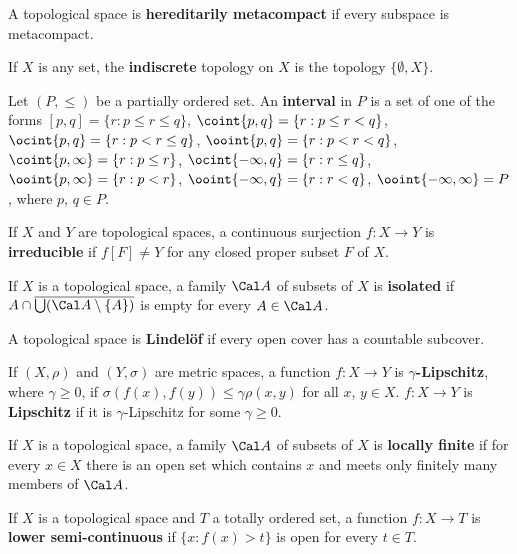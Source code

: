  A topological space is {\bf
hereditarily metacompact} if every subspace is metacompact.

 If $X$ is any set, the {\bf indiscrete} topology on
$X$ is the topology $\{\emptyset,X\}$.

 Let $(P,\le)$ be a partially ordered set.
An {\bf interval} in $P$ is a set of one of the forms
$[p,q]=\{r:p\le r\le q\}$, $\coint{p,q}=\{r:p\le r<q\}$,
$\ocint{p,q}=\{r:p<r\le q\}$, $\ooint{p,q}=\{r:p<r<q\}$,
$\coint{p,\infty}=\{r:p\le r\}$,
$\ocint{-\infty,q}=\{r:r\le q\}$, $\ooint{p,\infty}=\{r:p<r\}$,
$\ooint{-\infty,q}=\{r:r<q\}$, $\ooint{-\infty,\infty}=P$, where $p$,
$q\in P$.   

 If $X$ and $Y$ are topological spaces, a continuous
surjection $f:X\to Y$ is {\bf irreducible} if $f[F]\ne Y$ for any closed
proper subset $F$ of $X$.

 If $X$ is a topological space, a family
$\Cal A$ of subsets of $X$ is {\bf isolated}
if $A\cap\overline{\bigcup(\Cal A\setminus\{A\})}$ is empty for every
$A\in\Cal A$.

 A topological space is {\bf Lindel\"of} if every
open
cover has a countable subcover.    

 If $(X,\rho)$ and $(Y,\sigma)$ are metric spaces, a
function $f:X\to Y$ is {\bf $\gamma$-Lipschitz}, where $\gamma\ge 0$, if
$\sigma(f(x),f(y))\le\gamma\rho(x,y)$ for all $x$, $y\in X$.   $f:X\to Y$
is {\bf Lipschitz} if it is $\gamma$-Lipschitz for some $\gamma\ge 0$.

 If $X$ is a topological space, a family $\Cal A$
of
subsets of $X$ is {\bf locally finite} if for every $x\in X$ there is an
open set which contains $x$ and meets only finitely many members of
$\Cal A$.

 If $X$ is a topological space and $T$ a
totally ordered set, a function $f:X\to T$ is
{\bf lower semi-continuous} if $\{x:f(x)>t\}$ is open for every
$t\in T$.  

